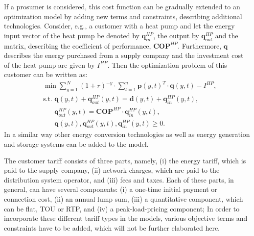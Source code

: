 \documentclass[conference]{IEEEtran}
\begin{document}
If a prosumer is considered, this cost function can be gradually
extended to an optimization model by adding new terms and constraints,
describing additional technologies. Consider, e.g., a customer with a
heat pump and let the energy input vector of the heat pump be denoted
by $\mathbf{q}_{in}^{HP}$, the output by $\mathbf{q}_{out}^{HP}$ and the matrix,
describing the coefficient of performance, $\mathbf{COP}^{HP}$. Furthermore,
$\mathbf{q}$ describes the energy purchased from a supply company and the
investment cost of the heat pump are given by $I^{HP}$. Then the
optimization problem of this customer can be written as: 
\begin{align*}
  & \min \sum_{y=1}^{N}(1+r)^{-y} \cdot \sum_{t=1}^{n} \mathbf{p}(y,t)^T \cdot
  \mathbf{q}(y,t) - I^{HP}, \\
  & \textrm{s.t. } \mathbf{q}(y,t) + \mathbf{q}_{out}^{HP} (y,t)  = \mathbf{d}(y,t) +
                     \mathbf{q}_{in}^{HP} (y,t), \\
  & \phantom{\textrm{s.t. }}\mathbf{q}_{out}^{HP}(y,t) = \mathbf{COP}^{HP} \cdot \mathbf{q}_{in}^{HP} (y,t), \\
  & \phantom{\textrm{s.t. }}\mathbf{q}(y,t), \mathbf{q}_{out}^{HP}(y,t), \mathbf{q}_{in}^{HP}(y,t) \geq 0.
\end{align*} %
In a similar way other energy conversion technologies as well as
energy generation and storage systems can be added to the model. 

The customer tariff consists of three parts, namely, (i) the energy
tariff, which is paid to the supply company, (ii) network charges,
which are paid to the distribution system operator, and (iii) fees and
taxes. Each of these parts, in general, can have several components:
(i) a one-time initial payment or connection cost, (ii) an annual lump
sum, (iii) a quantitative component, which can be flat, TOU or RTP,
and (iv) a peak-load-pricing component; In order to incorporate these
different tariff types in the models, various objective terms and
constraints have to be added, which will not be further elaborated
here. 
\end{document}
